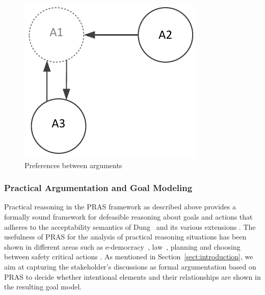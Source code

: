 \begin{figure}[ht]
\centering
\includegraphics[scale=0.8]{img/Fig2}
\caption{Preferences between arguments}
\label{fig:pras:example2}
\end{figure}  

\subsubsection{Practical Argumentation and Goal Modeling}
\label{sect:background:pras:motivation}

Practical reasoning in the PRAS framework as described above provides a formally sound framework for defeasible reasoning about goals and actions that adheres to the acceptability semantics of Dung~\cite{Dung1995} and its various extensions \cite{amgoud2002reasoning,modgil2009}. The usefulness of PRAS for the analysis of practical reasoning situations has been shown in different areas such as e-democracy~\cite{cartwright2009IS}, law~\cite{atkinson2005legal}, planning \cite{medellin2013planning} and choosing between safety critical actions \cite{tolchinsky2012deliberation}. As mentioned in Section~\ref{sect:introduction}, we aim at capturing the stakeholder's discussions as formal argumentation based on PRAS to decide whether intentional elements and their relationships are shown in the resulting goal model.


